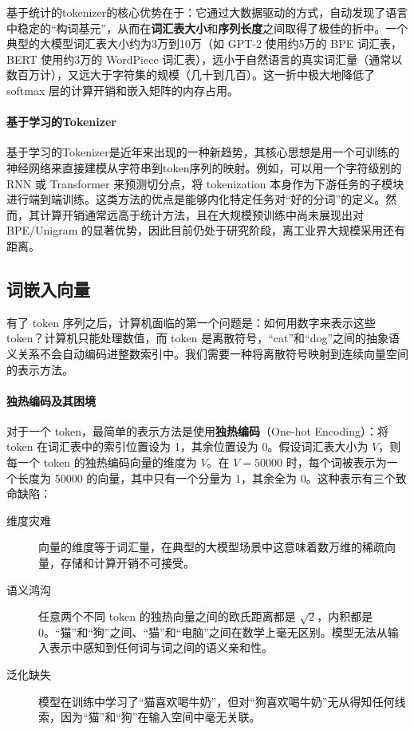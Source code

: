 基于统计的tokenizer的核心优势在于：它通过大数据驱动的方式，自动发现了语言中稳定的“构词基元”，从而在\textbf{词汇表大小}和\textbf{序列长度}之间取得了极佳的折中。一个典型的大模型词汇表大小约为3万到10万（如 GPT-2 使用约5万的 BPE 词汇表，BERT 使用约3万的 WordPiece 词汇表），远小于自然语言的真实词汇量（通常以数百万计），又远大于字符集的规模（几十到几百）。这一折中极大地降低了 softmax 层的计算开销和嵌入矩阵的内存占用。

\paragraph{基于学习的Tokenizer} 基于学习的Tokenizer是近年来出现的一种新趋势，其核心思想是用一个可训练的神经网络来直接建模从字符串到token序列的映射。例如，可以用一个字符级别的 RNN 或 Transformer 来预测切分点，将 tokenization 本身作为下游任务的子模块进行端到端训练。这类方法的优点是能够内化特定任务对“好的分词”的定义。然而，其计算开销通常远高于统计方法，且在大规模预训练中尚未展现出对 BPE/Unigram 的显著优势，因此目前仍处于研究阶段，离工业界大规模采用还有距离。

\subsection{词嵌入向量}

有了 token 序列之后，计算机面临的第一个问题是：如何用数字来表示这些 token？计算机只能处理数值，而 token 是离散符号，“cat”和“dog”之间的抽象语义关系不会自动编码进整数索引中。我们需要一种将离散符号映射到连续向量空间的表示方法。

\paragraph{独热编码及其困境} 对于一个 token，最简单的表示方法是使用\textbf{独热编码}（One-hot Encoding）：将 token 在词汇表中的索引位置设为 1，其余位置设为 0。假设词汇表大小为 $V$，则每一个 token 的独热编码向量的维度为 $V$。在 $V = 50000$ 时，每个词被表示为一个长度为 50000 的向量，其中只有一个分量为 1，其余全为 0。这种表示有三个致命缺陷：

\begin{description}
    \item[维度灾难] 向量的维度等于词汇量，在典型的大模型场景中这意味着数万维的稀疏向量，存储和计算开销不可接受。
    \item[语义鸿沟] 任意两个不同 token 的独热向量之间的欧氏距离都是 $\sqrt{2}$，内积都是 0。“猫”和“狗”之间、“猫”和“电脑”之间在数学上毫无区别。模型无法从输入表示中感知到任何词与词之间的语义亲和性。
    \item[泛化缺失] 模型在训练中学习了“猫喜欢喝牛奶”，但对“狗喜欢喝牛奶”无从得知任何线索，因为“猫”和“狗”在输入空间中毫无关联。
\end{description}


